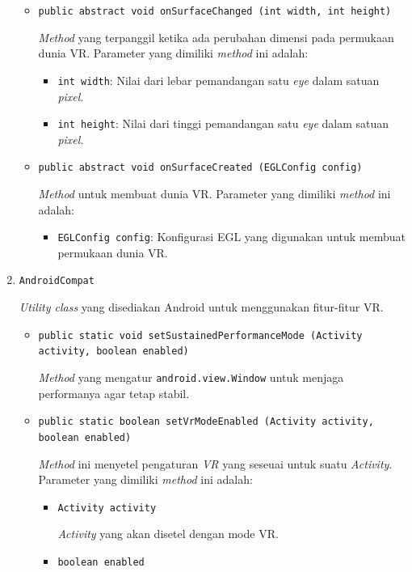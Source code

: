 \begin{enumerate}
\begin{itemize}
				\item \texttt{public abstract void onSurfaceChanged (int width, int height)}
				
				\textit{Method}	yang terpanggil ketika ada perubahan dimensi pada permukaan dunia VR. Parameter yang dimiliki \textit{method} ini adalah:
				
				\begin{itemize}
					\item \texttt{int width}: Nilai dari lebar pemandangan satu \textit{eye} dalam satuan \textit{pixel}.
					
					\item \texttt{int height}: Nilai dari tinggi pemandangan satu \textit{eye} dalam satuan \textit{pixel}.
				\end{itemize}
				
				\item \texttt{public abstract void onSurfaceCreated (EGLConfig config)}
				
\textit{Method} untuk membuat dunia VR. Parameter yang dimiliki \textit{method} ini adalah:
				\begin{itemize}
					\item \texttt{EGLConfig config}: Konfigurasi EGL yang digunakan untuk membuat permukaan dunia VR.
				\end{itemize}
			\end{itemize}					
		\item \texttt{AndroidCompat}
		
		\textit{Utility class} yang disediakan Android untuk menggunakan fitur-fitur VR.  
			\begin{itemize}
				\item \texttt{public static void setSustainedPerformanceMode (Activity activity, boolean enabled)}
				
\textit{Method} yang mengatur \texttt{android.view.Window} untuk menjaga performanya agar tetap stabil.
				\item \texttt{public static boolean setVrModeEnabled (Activity activity, boolean enabled)}
				
				\textit{Method} ini menyetel pengaturan \textit{VR} yang seseuai untuk suatu \textit{Activity}. Parameter yang dimiliki \textit{method} ini adalah:
				\begin{itemize}
					\item \texttt{Activity activity}
					
					\textit{Activity} yang akan disetel dengan mode VR.
					\item \texttt{boolean enabled}
					

\end{itemize}
\end{itemize}
\end{enumerate}
